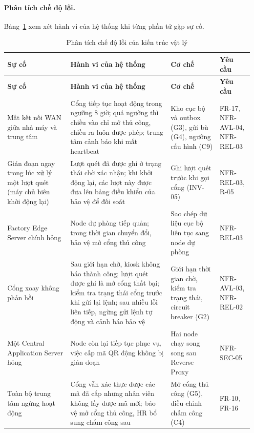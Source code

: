 \paragraph{Phân tích chế độ lỗi.} Bảng~\ref{tab:failure-modes} xem xét hành vi của hệ thống khi từng phần tử gặp sự cố.

\begingroup
\small
\renewcommand{\arraystretch}{1.3}
\begin{longtable}{|>{\raggedright\arraybackslash}p{3.2cm}|>{\raggedright\arraybackslash}p{5.4cm}|>{\raggedright\arraybackslash}p{4.0cm}|>{\raggedright\arraybackslash}p{2.2cm}|}
\caption{Phân tích chế độ lỗi của kiến trúc vật lý}\label{tab:failure-modes}\\
\hline
\textbf{Sự cố} & \textbf{Hành vi của hệ thống} & \textbf{Cơ chế} & \textbf{Yêu cầu} \\
\hline
\endfirsthead
\hline
\textbf{Sự cố} & \textbf{Hành vi của hệ thống} & \textbf{Cơ chế} & \textbf{Yêu cầu} \\
\hline
\endhead
\hline
\endfoot
\endlastfoot
Mất kết nối WAN giữa nhà máy và trung tâm & Cổng tiếp tục hoạt động trong ngưỡng 8 giờ; quá ngưỡng thì chiều vào chỉ mở thủ công, chiều ra luôn được phép; trung tâm cảnh báo khi mất heartbeat & Kho cục bộ và outbox (G3), gửi bù (G4), ngưỡng cấu hình (C9) & FR-17, NFR-AVL-04, NFR-REL-03 \\
\hline
Gián đoạn ngay trong lúc xử lý một lượt quét (máy chủ biên khởi động lại) & Lượt quét đã được ghi ở trạng thái chờ xác nhận; khi khởi động lại, các lượt này được đưa lên bảng điều khiển của bảo vệ để đối soát & Ghi lượt quét trước khi gọi cổng (INV-05) & NFR-REL-03, R-05 \\
\hline
Factory Edge Server chính hỏng & Node dự phòng tiếp quản; trong thời gian chuyển đổi, bảo vệ mở cổng thủ công & Sao chép dữ liệu cục bộ liên tục sang node dự phòng & NFR-REL-03 \\
\hline
Cổng xoay không phản hồi & Sau giới hạn chờ, kiosk không báo thành công; lượt quét được ghi là mở cổng thất bại; kiểm tra trạng thái cổng trước khi gửi lại lệnh; sau nhiều lỗi liên tiếp, ngừng gửi lệnh tự động và cảnh báo bảo vệ & Giới hạn thời gian chờ, kiểm tra trạng thái, circuit breaker (G2) & NFR-AVL-03, NFR-REL-02 \\
\hline
Một Central Application Server hỏng & Node còn lại tiếp tục phục vụ, việc cấp mã QR động không bị gián đoạn & Hai node chạy song song sau Reverse Proxy & NFR-SEC-05 \\
\hline
Toàn bộ trung tâm ngừng hoạt động & Cổng vẫn xác thực được các mã đã cấp nhưng nhân viên không lấy được mã mới; bảo vệ mở cổng thủ công, HR bổ sung chấm công sau & Mở cổng thủ công (G5), điều chỉnh chấm công (C4) & FR-10, FR-16 \\

\end{longtable}
